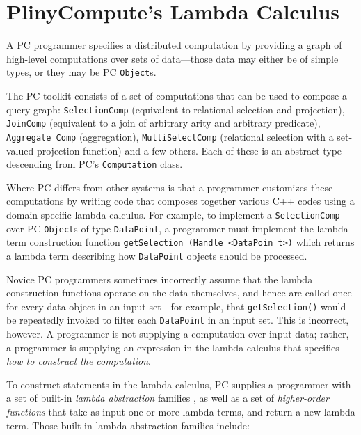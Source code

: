 \section{PlinyCompute's Lambda Calculus}
A PC programmer specifies a distributed computation by providing a graph of high-level computations over sets of data---those data
may either be of simple types, or they may be
PC \texttt{Object}s. 

The PC toolkit consists of a set of
computations that can be used to compose a query graph: 
\texttt{SelectionComp} (equivalent to relational selection and projection), \texttt{JoinComp} (equivalent to a join of arbitrary arity and arbitrary predicate), 
\texttt{Aggregate Comp} (aggregation), \texttt{MultiSelectComp} (relational selection with a set-valued projection function) and a few others.  
Each of these is an abstract type descending from PC's
\texttt{Computation} class.

\vspace{5pt}
\noindent
Where PC differs from other systems is that a programmer customizes these computations by writing code that composes together various C++ codes 
using a 
domain-specific lambda calculus.
For example, to implement a \texttt{SelectionComp} over PC \texttt{Object}s of type \texttt{DataPoint}, a programmer
must implement the lambda term construction function
\texttt{getSelection (Handle <DataPoin t>)} which returns a lambda term
describing how \texttt{DataPoint} objects
should be processed.

Novice PC programmers sometimes incorrectly assume that the lambda construction functions operate on the data themselves, and
hence are called once for every data object in an input set---for example, 
that
\texttt{getSelection()} would be repeatedly invoked to filter each \texttt{DataPoint} in an input set.  
This is incorrect, however.
A programmer is not supplying a computation over input data; rather, a programmer is supplying an expression in the lambda calculus that 
specifies \emph{how to construct the computation}.

To construct statements in the lambda calculus, PC supplies a programmer with a set of built-in \emph{lambda abstraction} 
families \cite{miller1991logic}, as 
well as a set of \emph{higher-order functions} \cite{chen1993hilog}
that take as input one or more lambda terms, and return a new lambda term.  Those built-in lambda abstraction families 
include:

